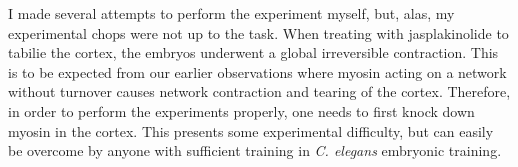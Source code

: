 I made several attempts to perform the experiment myself, but, alas, my experimental chops were not up to the task.  When treating with jasplakinolide to tabilie the cortex, the embryos underwent a global irreversible contraction. This is to be expected from our earlier observations where myosin acting on a network without turnover causes network contraction and tearing of the cortex. Therefore, in order to perform the experiments properly, one needs to first knock down myosin in the cortex.  This presents some experimental difficulty, but can easily be overcome by anyone with sufficient training in \textit{C. elegans} embryonic training.
